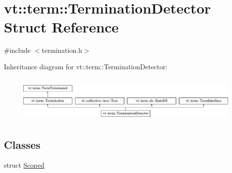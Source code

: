 \hypertarget{structvt_1_1term_1_1_termination_detector}{}\section{vt\+:\+:term\+:\+:Termination\+Detector Struct Reference}
\label{structvt_1_1term_1_1_termination_detector}


{\ttfamily \#include $<$termination.\+h$>$}

Inheritance diagram for vt\+:\+:term\+:\+:Termination\+Detector\+:\begin{figure}[H]
\begin{center}
\leavevmode
\includegraphics[height=2.346369cm]{structvt_1_1term_1_1_termination_detector}
\end{center}
\end{figure}
\subsection*{Classes}
\begin{DoxyCompactItemize}
\item 
struct \hyperlink{structvt_1_1term_1_1_termination_detector_1_1_scoped}{Scoped}
\end{DoxyCompactItemize}

